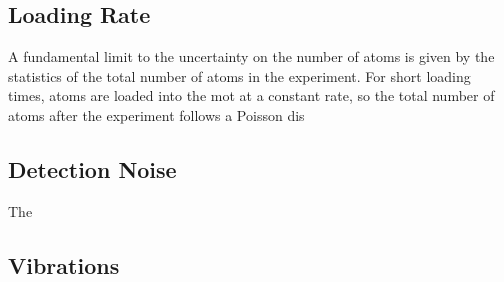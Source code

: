 \subsection{Loading Rate}
A fundamental limit to the uncertainty on the number of atoms is given by the
statistics of the total number of atoms in the experiment. For short loading
times, atoms are loaded into the \ac{mot} at a constant rate, so the total
number of atoms after the experiment follows a Poisson dis 
\subsection{Detection Noise}
The
\subsection{Vibrations}









